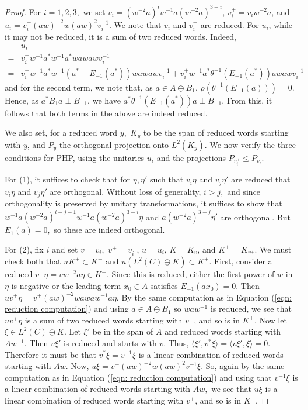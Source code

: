 \documentclass{amsart}
\theoremstyle{definition}
\begin{document}
\begin{proof}
    For $i=1,2,3,$ we set $v_i = (w^{-2}a)^iw^{-1}a(w^{-2}a)^{3-i}$, $v_i^+ = v_i w^{-2}a$, and $u_i = v_i^+(aw)^{-2}w(aw)^2v_i^{-1}$. We note that $v_i$ and $v_i^+$ are reduced. For $u_i$, while it may not be reduced, it is a sum of two reduced words. Indeed,
    \begin{equation}\label{eqn: reduction computation}
    \begin{split}
        &u_i\\
        = &v_i^+w^{-1}a^\ast w^{-1}a^\ast wawawv_i^{-1}\\
        = &v_i^+w^{-1}a^\ast w^{-1}(a^\ast - E_{-1}(a^\ast))wawawv_i^{-1} + v_i^+w^{-1}a^\ast\theta^{-1}(E_{-1}(a^\ast))awawv_i^{-1}
    \end{split}
    \end{equation}
    and for the second term, we note that, as $a \in A \ominus B_1$, $\rho(\theta^{-1}(E_{-1}(a))) = 0$. Hence, as $a^\ast B_1a \perp B_{-1}$, we have $a^\ast\theta^{-1}(E_{-1}(a^\ast))a \perp B_{-1}$. From this, it follows that both terms in the above are indeed reduced.
    
    We also set, for a reduced word $y,$ $K_y$ to be the span of reduced words starting with $y$, and $P_y$ the orthogonal projection onto $L^2(K_y)$. We now verify the three conditions for PHP, using the unitaries $u_i$ and the projections $P_{v_i^+} \leq P_{v_i}$.

    For (1), it suffices to check that for $\eta,\eta'$ such that $v_i\eta$ and $v_j\eta'$ are reduced that $v_i\eta$ and $v_j\eta'$ are orthogonal. Without loss of generality, $i>j,$ and since orthogonality is preserved by unitary transformations, it suffices to show that $w^{-1}a(w^{-2}a)^{i-j-1}w^{-1}a(w^{-2}a)^{3-i}\eta$ and $a(w^{-2}a)^{3-j}\eta'$ are orthogonal. But $E_1(a)=0,$ so these are indeed orthogonal.

    For (2), fix $i$ and set $v=v_i,$ $v^+ = v_i^+$, $u = u_i$, $K = K_{v}$, and $K^+ = K_{v^+}$. We must check both that $uK^+\subset K^+$ and $u(L^2(C)\ominus K) \subset K^+$. First, consider a reduced $v^+\eta = v w^{-2}a \eta \in K^+$. Since this is reduced, either the first power of $w$ in $\eta$ is negative or the leading term $x_0\in A$ satisfies $E_{-1}(ax_0) = 0$. Then $uv^+\eta = v^+ (aw)^{-2}wawaw^{-1}a\eta$. By the same computation as in Equation (\ref{eqn: reduction computation}) and using $a \in A \ominus B_1$ so $waw^{-1}$ is reduced, we see that $uv^+\eta$ is a sum of two reduced words starting with $v^+$, and so is in $K^+$. Now let $\xi \in L^2(C)\ominus K$. Let $\xi'$ be in the span of $A$ and reduced words starting with $Aw^{-1}$. Then $v\xi'$ is reduced and starts with $v$. Thus, $\langle \xi', v^*\xi\rangle = \langle v\xi',\xi\rangle = 0$. Therefore it must be that $v^*\xi = v^{-1}\xi$ is a linear combination of reduced words starting with $Aw.$ Now, $u\xi = v^+(aw)^{-2}w(aw)^2v^{-1}\xi$. So, again by the same computation as in Equation (\ref{eqn: reduction computation}) and using that $v^{-1}\xi$ is a linear combination of reduced words starting with $Aw,$ we see that $u\xi$ is a linear combination of reduced words starting with $v^+$, and so is in $K^+$.


\end{proof}
\end{document}
